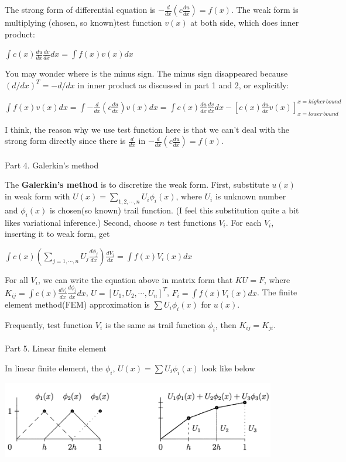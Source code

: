 \documentclass{article}
\newenvironment{nscenter}
{\parskip=0pt\par\nopagebreak\centering}
{\par\noindent\ignorespacesafterend}
\begin{document}
\begin{spacing}{1.5}
The strong form of differential equation is $-\frac{d}{dx}(c\frac{du}{dx})=f(x)$. The weak form is multiplying (chosen, so known)test function $v(x)$ at both side, which does inner product:
\begin{nscenter}
	$\int c(x)\frac{du}{dx}\frac{dv}{dx} dx=\int f(x)v(x)dx$
\end{nscenter}
You may wonder where is the minus sign. The minus sign disappeared because $(d/dx)^T=-d/dx$ in inner product as discussed in part 1 and 2, or explicitly:
\begin{nscenter}
	$ \int f(x)v(x)dx = \int - \frac{d}{dx}(c\frac{du}{dx})v(x)dx = \int c(x) \frac{du}{dx}\frac{dv}{dx}dx - [c(x)\frac{du}{dx}v(x)]_{x=lower \, bound}^{x=higher \,  bound}$
\end{nscenter}

I think, the reason why we use test function here is that we can't deal with the strong form directly since there is $\frac{d}{dx}$ in $-\frac{d}{dx}(c\frac{du}{dx})=f(x)$.
\\\\Part 4. Galerkin's method

The {\bfseries Galerkin's method} is to discretize the weak form. First, substitute $u(x)$ in weak form with $U(x)=\sum_{1, 2, \cdots, n} U_i \phi _i(x)$, where $U_i$ is unknown number and $\phi _i(x)$ is chosen(so known) trail function. (I feel this substitution quite a bit likes variational inference.) Second, choose $n$ test functions $V_i$. For each $V_i$, inserting it to weak form, get 
\begin{nscenter}
	$\int c(x) (\sum_{j=1,\cdots, n} U_j\frac{d\phi_j}{dx})\frac{dV_i}{dx}=\int f(x)V_i(x)dx$
\end{nscenter}
For all $V_i$, we can write the equation above in matrix form that $KU=F$, where $K_{ij}=\int c(x)\frac{dV_i}{dx}\frac{d\phi_j}{dx}dx$, $U=[U_1, U_2, \cdots, U_n]^T$, $F_i=\int f(x)V_i(x)dx$. The finite element method(FEM) approximation is $\sum U_i\phi_i(x)$ for $u(x)$.

Frequently, test function $V_i$ is the same as trail function $\phi_i$, then $K_{ij} = K_{ji}$.
\\\\Part 5. Linear finite element

In linear finite element, the $\phi_i$, $U(x)=\sum U_i \phi_i(x)$ look like below
\\\begin{center}
	\includegraphics[width=0.9\textwidth]{linear_finite_element.png} \\ 
\end{center}


\end{spacing}
\end{document}
